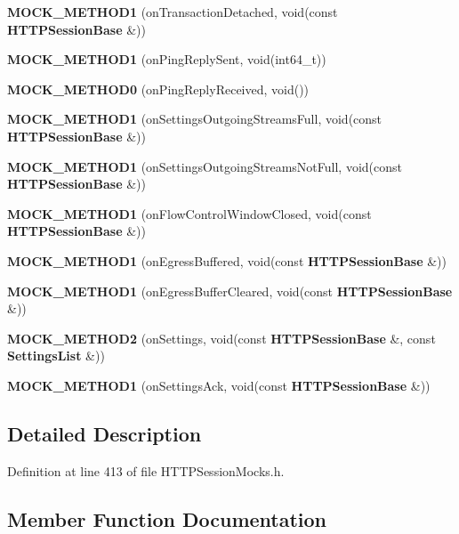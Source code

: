 \begin{DoxyCompactItemize}
\item 
{\bf M\+O\+C\+K\+\_\+\+M\+E\+T\+H\+O\+D1} (on\+Transaction\+Detached, void(const {\bf H\+T\+T\+P\+Session\+Base} \&))
\item 
{\bf M\+O\+C\+K\+\_\+\+M\+E\+T\+H\+O\+D1} (on\+Ping\+Reply\+Sent, void(int64\+\_\+t))
\item 
{\bf M\+O\+C\+K\+\_\+\+M\+E\+T\+H\+O\+D0} (on\+Ping\+Reply\+Received, void())
\item 
{\bf M\+O\+C\+K\+\_\+\+M\+E\+T\+H\+O\+D1} (on\+Settings\+Outgoing\+Streams\+Full, void(const {\bf H\+T\+T\+P\+Session\+Base} \&))
\item 
{\bf M\+O\+C\+K\+\_\+\+M\+E\+T\+H\+O\+D1} (on\+Settings\+Outgoing\+Streams\+Not\+Full, void(const {\bf H\+T\+T\+P\+Session\+Base} \&))
\item 
{\bf M\+O\+C\+K\+\_\+\+M\+E\+T\+H\+O\+D1} (on\+Flow\+Control\+Window\+Closed, void(const {\bf H\+T\+T\+P\+Session\+Base} \&))
\item 
{\bf M\+O\+C\+K\+\_\+\+M\+E\+T\+H\+O\+D1} (on\+Egress\+Buffered, void(const {\bf H\+T\+T\+P\+Session\+Base} \&))
\item 
{\bf M\+O\+C\+K\+\_\+\+M\+E\+T\+H\+O\+D1} (on\+Egress\+Buffer\+Cleared, void(const {\bf H\+T\+T\+P\+Session\+Base} \&))
\item 
{\bf M\+O\+C\+K\+\_\+\+M\+E\+T\+H\+O\+D2} (on\+Settings, void(const {\bf H\+T\+T\+P\+Session\+Base} \&, const {\bf Settings\+List} \&))
\item 
{\bf M\+O\+C\+K\+\_\+\+M\+E\+T\+H\+O\+D1} (on\+Settings\+Ack, void(const {\bf H\+T\+T\+P\+Session\+Base} \&))
\end{DoxyCompactItemize}


\subsection{Detailed Description}


Definition at line 413 of file H\+T\+T\+P\+Session\+Mocks.\+h.



\subsection{Member Function Documentation}

